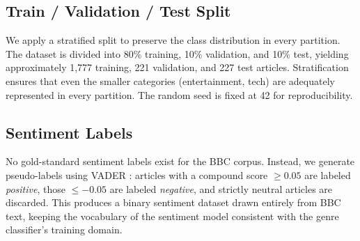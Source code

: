 \subsection{Train / Validation / Test Split}

We apply a stratified split to preserve the class distribution in every partition. The dataset is divided into 80\% training, 10\% validation, and 10\% test, yielding approximately 1,777 training, 221 validation, and 227 test articles. Stratification ensures that even the smaller categories (entertainment, tech) are adequately represented in every partition. The random seed is fixed at 42 for reproducibility.

\subsection{Sentiment Labels}

No gold-standard sentiment labels exist for the BBC corpus. Instead, we generate pseudo-labels using VADER \cite{hutto2014vader}: articles with a compound score $\geq 0.05$ are labeled \textit{positive}, those $\leq -0.05$ are labeled \textit{negative}, and strictly neutral articles are discarded. This produces a binary sentiment dataset drawn entirely from BBC text, keeping the vocabulary of the sentiment model consistent with the genre classifier's training domain.
